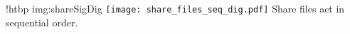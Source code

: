 \namedfigure
{!htbp}
{img:shareSigDig}
{\texttt{[image: share\_files\_seq\_dig.pdf]}}
{Share files act in sequential order.}

